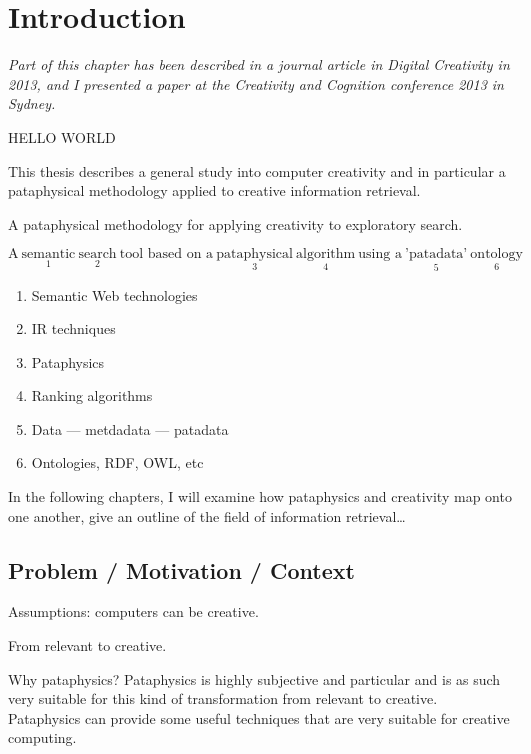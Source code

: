 
\chapter{Introduction}
\label{ch:intro}

\emph{Part of this chapter has been described in a journal article in Digital Creativity in 2013, and I presented a paper at the Creativity and Cognition conference 2013 in Sydney.} 

\grule %

{\color{red} HELLO WORLD}%

This thesis describes a general study into computer creativity and in particular a pataphysical methodology applied to creative information retrieval.

A pataphysical methodology for applying creativity to exploratory search.

$\text{A} \ \underset{1}{\text{semantic}} \ \underset{2}{\text{search}} \ \text{tool based on a} \ \underset{3}{\text{pataphysical}} \ \underset{4}{\text{algorithm}} \ \text{using a} \ \underset{5}{\text{'patadata'}} \ \underset{6}{\text{ontology}}$

\begin{enumerate}
  \item Semantic Web technologies
  \item IR techniques
  \item Pataphysics
  \item Ranking algorithms
  \item Data --- metdadata --- patadata
  \item Ontologies, RDF, OWL, etc
\end{enumerate}


In the following chapters, I will examine how pataphysics and creativity map onto one another, give an outline of the field of information retrieval\ldots

\section{Problem / Motivation / Context}

Assumptions: computers can be creative.

From relevant to creative.

Why pataphysics?
Pataphysics is highly subjective and particular and is as such very suitable for this kind of transformation from relevant to creative.
Pataphysics can provide some useful techniques that are very suitable for creative computing.

